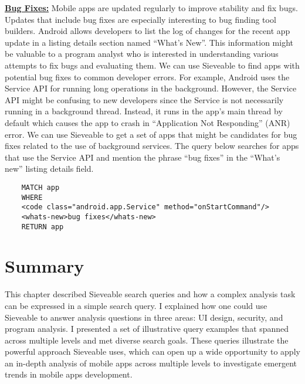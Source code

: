 \underline{\textbf{{Bug Fixes:}}}
Mobile apps are updated regularly to improve stability and fix bugs.
Updates that include bug fixes are especially interesting to bug finding tool builders.
Android allows developers to list the log of changes for the recent app update in a listing details section named ``What's New''.
This information might be valuable to a program analyst who is interested in understanding various attempts to fix bugs and evaluating them.
We can use Sieveable to find apps with potential bug fixes to common developer errors.
For example, Android uses the Service API for running long operations in the background.
However, the Service API might be confusing to new developers since the Service is not necessarily running in a background thread.
Instead, it runs in the app's main thread by default which causes the app to crash in ``Application Not Responding'' (ANR) error.
We can use Sieveable to get a set of apps that might be candidates for bug fixes related to the use of background services. The query below searches for apps that use the Service API and mention the phrase ``bug fixes'' in the ``What's new'' listing details field.

\begin{verbatim}
	MATCH app
	WHERE
	<code class="android.app.Service" method="onStartCommand"/>
	<whats-new>bug fixes</whats-new> 
	RETURN app
\end{verbatim}

\section{Summary}
This chapter described Sieveable search queries and how a complex analysis task can be expressed in a simple search query.
I explained how one could use Sieveable to answer analysis questions in three areas: UI design, security, and program analysis.
I presented a set of illustrative query examples that spanned across multiple levels and met diverse search goals.
These queries illustrate the powerful approach Sieveable uses, which can open up a wide opportunity to apply an in-depth analysis of mobile apps across multiple levels to investigate emergent trends in mobile apps development.